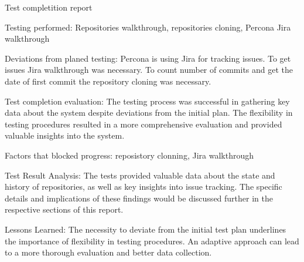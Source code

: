 Test completition report

Testing performed: Repositories walkthrough, repositories cloning, Percona Jira walkthrough

Deviations from planed testing: Percona is using Jira for tracking issues. To get issues Jira walkthrough was necessary. To count number of commits and get the date of first commit the repository cloning was necessary.

Test completion evaluation: The testing process was successful in gathering key data about the system despite deviations from the initial plan. The flexibility in testing procedures resulted in a more comprehensive evaluation and provided valuable insights into the system.

Factors that blocked progress: reposistory clonning, Jira walkthrough

Test Result Analysis: The tests provided valuable data about the state and history of repositories, as well as key insights into issue tracking. The specific details and implications of these findings would be discussed further in the respective sections of this report.

Lessons Learned: The necessity to deviate from the initial test plan underlines the importance of flexibility in testing procedures. An adaptive approach can lead to a more thorough evaluation and better data collection.






